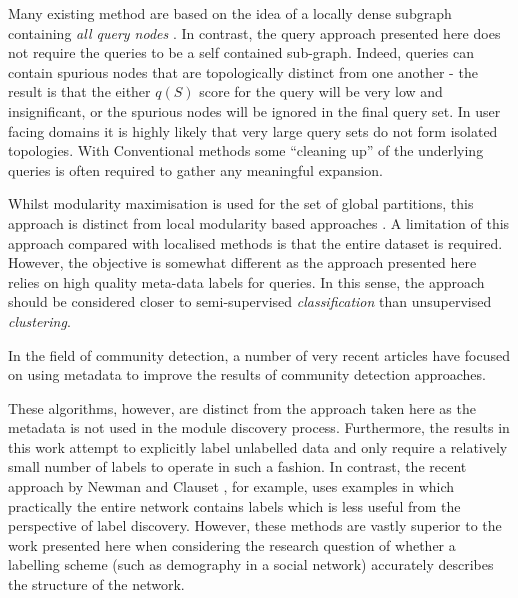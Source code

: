 \documentclass[manuscript, proceedings]{acmart}
\begin{document}
Many existing method are based on the idea of a locally dense subgraph containing \textit{all query nodes} \cite{}.
In contrast, the query approach presented here does not require the queries to be a self contained sub-graph.
Indeed, queries can contain spurious nodes that are topologically distinct from one another - the result is that the either $q(S)$ score for the query will be very low and insignificant, or the spurious nodes will be ignored in the final query set.
In user facing domains it is highly likely that very large query sets do not form isolated topologies.
With Conventional methods some ``cleaning up'' of the underlying queries is often required to gather any meaningful expansion.

Whilst modularity maximisation is used for the set of global partitions, this approach is distinct from local modularity based approaches \cite{}.
A limitation of this approach compared with localised methods is that the entire dataset is required.
However, the objective is somewhat different as the approach presented here relies on high quality meta-data labels for queries.
In this sense, the approach should be considered closer to semi-supervised \textit{classification} than unsupervised \textit{clustering}.

In the field of community detection, a number of very recent articles have focused on using metadata to improve the results of community detection approaches.


These algorithms, however, are distinct from the approach taken here as the metadata is not used in the module discovery process.
Furthermore, the results in this work attempt to explicitly label unlabelled data and only require a relatively small number of labels to operate in such a fashion.
In contrast,  the recent approach by Newman and Clauset \cite{}, for example, uses examples in which practically the entire network contains labels which is less useful from the perspective of label discovery.
However, these methods are vastly superior to the work presented here when considering the research question of whether a labelling scheme (such as demography in a social network) accurately describes the structure of the network. 
\end{document}
